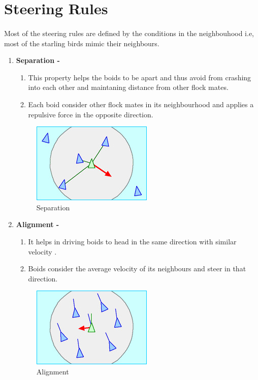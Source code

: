 \documentclass[12pt]{report}
\begin{document}
\section*{Steering Rules}
\paragraph*{}
Most of the steering rules are defined by the conditions in the neighbouhood i.e, most of the starling birds mimic their neighbours.
\begin{enumerate}
    \item \textbf{\large{Separation -}}
    \begin{enumerate}
        \item This property helps the boids to be apart and thus avoid from crashing into each other and maintaning distance from other flock mates.
        \item Each boid consider other flock mates in its neighbourhood and applies a repulsive force in the opposite direction.
    \end{enumerate}
    
    \begin{figure}[h!]
    \centering
    \includegraphics{separation.jpg}
    \caption{Separation}
    \label{fig:Separation}
    \end{figure}
    
    \item \textbf{\large{Alignment -}}
    \begin{enumerate}
        \item It helps in driving boids to head in the same direction with similar velocity .
        \item Boids consider the average velocity of its neighbours and steer in that direction.
    \end{enumerate}
    
    \begin{figure}[h!]
    \centering
    \includegraphics{alignment.jpg}
    \caption{Alignment}
    \label{fig:Alignment}
    \end{figure}
    

\end{enumerate}
\end{document}
